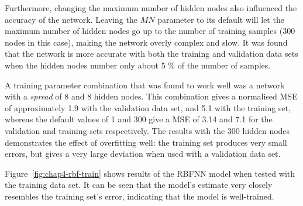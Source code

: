 Furthermore, changing the maximum number of hidden nodes also influenced the accuracy of the network. Leaving the $\mathit{MN}$ parameter to its default will let the maximum number of hidden nodes go up to the number of training samples (300 nodes in this case), making the network overly complex and slow. It was found that the network is more accurate with both the training and validation data sets when the hidden nodes number only about 5 \% of the number of samples. 

A training parameter combination that was found to work well was a network with a \emph{spread} of 8 and 8 hidden nodes. This combination gives a normalised MSE of approximately 1.9 with the validation data set, and 5.1 with the training set, whereas the default values of 1 and 300 give a MSE of 3.14 and 7.1 for the validation and training sets respectively. The results with the 300 hidden nodes demonstrates the effect of overfitting well: the training set produces very small errors, but gives a very large deviation when used with a validation data set.    

Figure~\ref{fig:chap4-rbf-train} shows results of the RBFNN model when tested with the training data set. It can be seen that the model's estimate very closely resembles the training set's error, indicating that the model is well-trained. 

